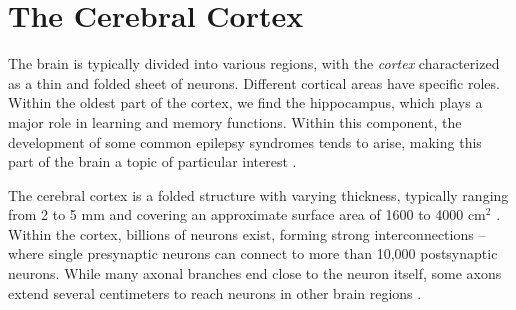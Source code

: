 \documentclass[a4paper, UKenglish, 11pt]{uiomaster}
\begin{document}


\section{The Cerebral Cortex}
The brain is typically divided into various regions, with the \emph{cortex} characterized as a thin and folded sheet of neurons. Different cortical areas have specific roles. \cite{gerstner2014neuronal} Within the oldest part of the cortex, we find the hippocampus, which plays a major role in learning and memory functions. Within this component, the development of some common epilepsy syndromes tends to arise, making this part of the brain a topic of particular interest \cite{bromfield2006introduction}.

The cerebral cortex is a folded structure with varying thickness, typically ranging from 2 to 5 mm and covering an approximate surface area of 1600 to 4000 cm$^2$ \cite{nunez2006electric}. Within the cortex, billions of neurons exist, forming strong interconnections -- where single presynaptic neurons can connect to more than 10,000 postsynaptic neurons. While many axonal branches end close to the neuron itself, some axons extend several centimeters to reach neurons in other brain regions \cite{gerstner2014neuronal}.
\end{document}

